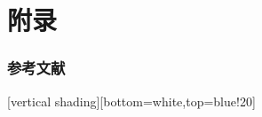 \documentclass{模版}
\begin{document}
\section{附录}
\begin{frame}\frametitle{参考文献}
\scriptsize
    \printbibliography[heading=subbibliography,title={参考文献}]
\end{frame}

%     
%     
%     
%     
%     
%     
%     

[vertical shading][bottom=white,top=blue!20]
\begin{frame}
    \begin{center}
        {\huge \textcolor[rgb]{0.50,0.00,1.00}{}}
    \end{center}
\end{frame}
\end{document}
